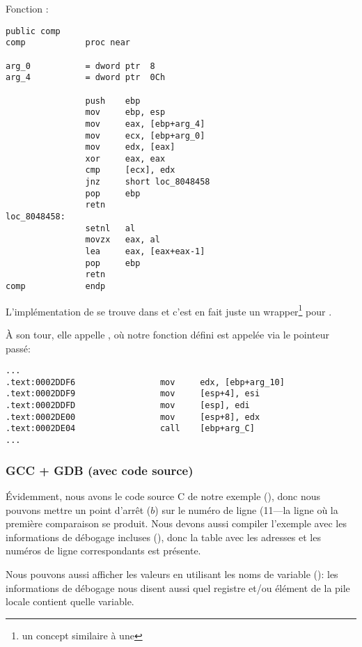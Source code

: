 Fonction \comp:

\begin{lstlisting}[style=customasmx86]
                public comp
comp            proc near

arg_0           = dword ptr  8
arg_4           = dword ptr  0Ch

                push    ebp
                mov     ebp, esp
                mov     eax, [ebp+arg_4]
                mov     ecx, [ebp+arg_0]
                mov     edx, [eax]
                xor     eax, eax
                cmp     [ecx], edx
                jnz     short loc_8048458
                pop     ebp
                retn
loc_8048458:
                setnl   al
                movzx   eax, al
                lea     eax, [eax+eax-1]
                pop     ebp
                retn
comp            endp
\end{lstlisting}


L'implémentation de \qsort se trouve dans  et c'est en fait juste un
wrapper\footnote{un concept similaire à une }
pour .

À son tour, elle appelle , où notre fonction défini est appelée via
le pointeur passé:

\begin{lstlisting}[caption=(fihier libc.so.6{,} glibc version---2.10.1),style=customasmx86]
...
.text:0002DDF6                 mov     edx, [ebp+arg_10]
.text:0002DDF9                 mov     [esp+4], esi
.text:0002DDFD                 mov     [esp], edi
.text:0002DE00                 mov     [esp+8], edx
.text:0002DE04                 call    [ebp+arg_C]
...
\end{lstlisting}

\subsubsection{GCC + GDB (avec code source)}

Évidemment, nous avons le code source C de notre exemple (), donc
nous pouvons mettre un point d'arrêt ($b$) sur le numéro de ligne (11---la ligne
où la première comparaison se produit.
Nous devons aussi compiler l'exemple avec les informations de débogage incluses (),
donc la table avec les adresses et les numéros de ligne correspondants est présente.

Nous pouvons aussi afficher les valeurs en utilisant les noms de variable ():
les informations de débogage nous disent aussi quel registre et/ou élément de la
pile locale contient quelle variable.

